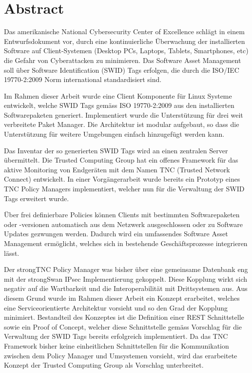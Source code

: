 \section{Abstract}

Das amerikanische National Cybersecurity Center of Excellence
schlägt in einem Entwurfsdokument vor, durch eine kontinuierliche
Überwachung der installierten Software auf Client-Systemen
(Desktop PCs, Laptops, Tablets, Smartphones, etc) die Gefahr von
Cyberattacken zu minimieren. Das Software Asset Management soll
über Software Identification (SWID) Tags erfolgen, die durch die
ISO/IEC 19770-2:2009 Norm international standardisiert sind.


Im Rahmen dieser Arbeit wurde eine Client Komponente für Linux Systeme
entwickelt, welche SWID Tags gemäss ISO 19770-2:2009 aus den installierten
Softwarepaketen generiert. Implementiert wurde die Unterstützung für drei weit
verbreitete Paket Manager. Die Architektur ist modular aufgebaut, so dass die
Unterstützung für weitere Umgebungen einfach hinzugefügt werden kann.

Das Inventar der so generierten SWID Tags wird an einen zentralen Server
übermittelt. Die Trusted Computing Group hat ein offenes Framework für
das aktive Monitoring von Endgeräten mit dem Namen TNC (Trusted Network
Connect) entwickelt. In einer Vorgängerarbeit wurde bereits ein Prototyp eines
TNC Policy Managers implementiert, welcher nun für die Verwaltung der SWID Tags
erweitert wurde.

Über frei definierbare Policies können Clients mit bestimmten Softwarepaketen
oder -versionen automatisch aus dem Netzwerk ausgeschlossen oder zu Software
Updates gezwungen werden. Dadurch wird ein umfassendes Software Asset
Management ermöglicht, welches sich in bestehende Geschäftsprozesse integrieren
lässt.

Der strongTNC Policy Manager was bisher über eine gemeinsame Datenbank eng mit
der strongSwan IPsec Implementierung gekoppelt. Diese Kopplung wirkt sich
negativ auf die Wartbarkeit und die Interoperabilität mit Drittsystemen aus.
Aus diesem Grund wurde im Rahmen dieser Arbeit ein Konzept erarbeitet, welches
eine Serviceorientierte Architektur vorsieht und so den Grad der Kopplung minimiert.
Bestandteil des Konzeptes ist die Definition einer REST Schnittstelle sowie ein Proof of Concept, welcher
diese Schnittstelle gemäss Vorschlag für die Verwaltung der SWID Tags bereits
erfolgreich implementiert. Da das TNC Framework bisher keine einheitlichen Schnittstellen für die Kommunikation
zwischen dem Policy Manager und Umsystemen vorsieht, wird das
erarbeitete Konzept der Trusted Computing Group als Vorschlag
unterbreitet.